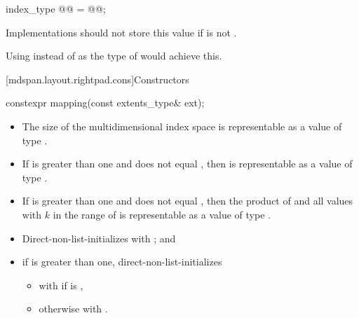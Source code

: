 \begin{itemdecl}
index_type @@ = @@;
\end{itemdecl}

\begin{itemdescr}
\pnum
\recommended
Implementations should not store this value
if  is not .
\begin{note}
Using 
instead of  as the type of 
would achieve this.
\end{note}
\end{itemdescr}

[mdspan.layout.rightpad.cons]{Constructors}

%
\begin{itemdecl}
constexpr mapping(const extents_type& ext);
\end{itemdecl}

\begin{itemdescr}
\pnum
\expects
\begin{itemize}
\item
The size of the multidimensional index space 
is representable as a value of type .
\item
If  is greater than one and
 does not equal ,
then 
is representable as a value of type .
\item
If  is greater than one and
 does not equal ,
then the product of
 and
all values 
with $k$ in the range of 
is representable as a value of type .
\end{itemize}

\pnum
\effects
\begin{itemize}
\item
Direct-non-list-initializes  with ; and
\item
if  is greater than one,
direct-non-list-initializes 
\begin{itemize}
\item
with 
if  is ,
\item
otherwise with
.
\end{itemize}
\end{itemize}
\end{itemdescr}

